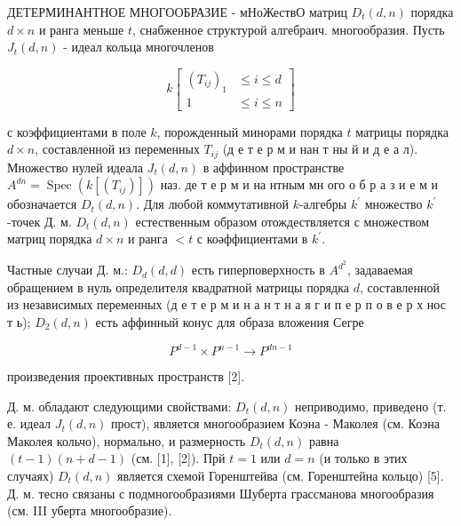 \documentclass[10pt]{article}
\begin{document}
ДЕТЕРМИНАНТНОЕ МНОГООБРАЗИЕ - мНоЖествО матриц $D_{t}(d, n)$ порядка $d \times n$ и ранга меньше $t$, снабженное структурой алгебраич. многообразия. Пусть $J_{t}(d, n)$ - идеал кольца многочленов



\[

k\left[\begin{array}{rl}

\left(T_{i j}\right)_{1} & \leqslant i \leqslant d \\

1 & \leqslant i \leqslant n

\end{array}\right]

\]



с коэффициентами в поле $k$, порожденный минорами порядка $t$ матрицы порядка $d \times n$, составленной из переменных $T_{i j}$ (д е т е р м и нан т ны й и д е а л). Множество нулей идеала $J_{t}(d, n)$ в аффинном пространстве $A^{d n}=\operatorname{Spec}\left(k\left[\left(T_{i j}\right)\right]\right)$ наз. де т е р м и на нтным мн ого о б р а з и е м и обозначается $D_{t}(d, n)$. Для любой коммутативной $k$-алгебры $k^{\prime}$ множество $k^{\prime}$-точек Д. м. $D_{t}(d, n)$ естественным образом отождествляется с множеством матриц порядка $d \times n$ и ранга $<t$ с коәффициентами в $k^{\prime}$.



Частные случаи Д. м.: $D_{d}(d, d)$ есть гиперповерхность в $A^{d^{2}}$, задаваемая обращением в нуль определителя квадратной матрицы порядка $d$, составленной из независимых переменных (д е т е р м и н а н т н а я г и п е р п о в е р х нос т ь); $D_{2}(d, n)$ есть аффинный конус для образа вложения Сегре



\[

P^{d-1} \times P^{n-1} \longrightarrow P^{d n-1}

\]



произведения проективных пространств [2].



Д. м. обладают следующими свойствами: $D_{t}(d, n)$ неприводимо, приведено (т. е. идеал $J_{t}(d, n)$ прост), является многообразием Коэна - Маколея (см. Коэна Маколея кольчо), нормально, и размерность $D_{t}(d, n)$ равна $(t-1)(n+d-1)$ (см. [1], [2]). Прй $t=1$ или $d=n$ (и только в этих случаях) $D_{t}(d, n)$ является схемой Горенштейва (см. Горенштейна кольцо) [5]. Д. м. тесно связаны с подмногообразиями Шуберта грассманова многообразия (см. III уберта многообразие).
\end{document}
